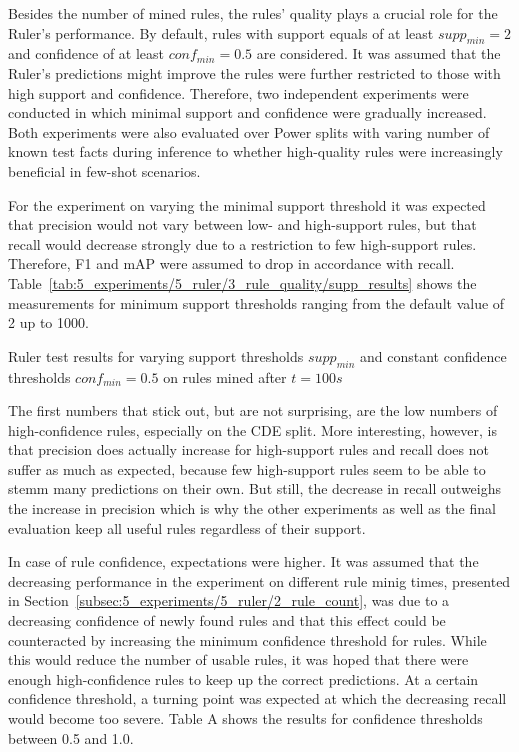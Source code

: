 Besides the number of mined rules, the rules' quality plays a crucial role for the Ruler's performance. By default, rules with support equals of at least $supp_{min} = 2$ and confidence of at least $conf_{min} = 0.5$ are considered. It was assumed that the Ruler's predictions might improve the rules were further restricted to those with high support and confidence. Therefore, two independent experiments were conducted in which minimal support and confidence were gradually increased. Both experiments were also evaluated over Power splits with varing number of known test facts during inference to whether high-quality rules were increasingly beneficial in few-shot scenarios.

For the experiment on varying the minimal support threshold it was expected that precision would not vary between low- and high-support rules, but that recall would decrease strongly due to a restriction to few high-support rules. Therefore, F1 and mAP were assumed to drop in accordance with recall. Table~\ref{tab:5_experiments/5_ruler/3_rule_quality/supp_results} shows the measurements for minimum support thresholds ranging from the default value of 2 up to 1000.

\begin{table}
    \centering
    
    \caption{Ruler test results for varying support thresholds $supp_{min}$ and constant confidence thresholds $conf_{min} = 0.5$ on rules mined after $t = 100s$}
    \label{tab:5_experiments/5_ruler/3_rule_quality/supp_results}
\end{table}

The first numbers that stick out, but are not surprising, are the low numbers of high-confidence rules, especially on the CDE split. More interesting, however, is that precision does actually increase for high-support rules and recall does not suffer as much as expected, because few high-support rules seem to be able to stemm many predictions on their own. But still, the decrease in recall outweighs the increase in precision which is why the other experiments as well as the final evaluation keep all useful rules regardless of their support.

In case of rule confidence, expectations were higher. It was assumed that the decreasing performance in the experiment on different rule minig times, presented in Section~\ref{subsec:5_experiments/5_ruler/2_rule_count}, was due to a decreasing confidence of newly found rules and that this effect could be counteracted by increasing the minimum confidence threshold for rules. While this would reduce the number of usable rules, it was hoped that there were enough high-confidence rules to keep up the correct predictions. At a certain confidence threshold, a turning point was expected at which the decreasing recall would become too severe. Table A shows the results for confidence thresholds between 0.5 and 1.0.

